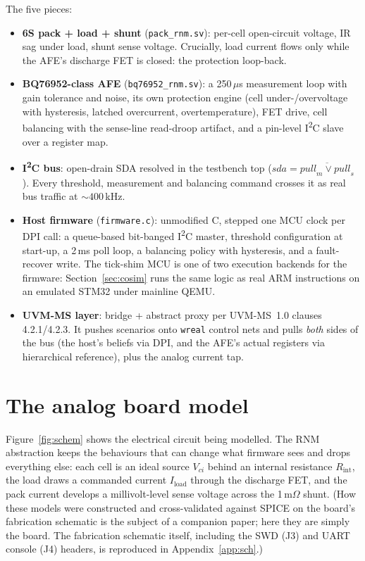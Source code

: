 \documentclass[11pt]{article}
\newcommand{\iic}{I\textsuperscript{2}C}
\begin{document}
The five pieces:

\begin{itemize}
  \item \textbf{6S pack + load + shunt} (\texttt{pack\_rnm.sv}):
    per-cell open-circuit voltage, IR sag under load, shunt sense
    voltage.  Crucially, load current flows only while the AFE's
    discharge FET is closed: the protection loop-back.
  \item \textbf{BQ76952-class AFE} (\texttt{bq76952\_rnm.sv}):
    a 250\,$\mu$s measurement loop with gain tolerance and noise, its
    own protection engine (cell under-/overvoltage with hysteresis,
    latched overcurrent, overtemperature), FET drive, cell balancing
    with the sense-line read-droop artifact, and a pin-level \iic{}
    slave over a register map.
  \item \textbf{\iic{} bus}: open-drain SDA resolved in the testbench
    top ($\mathit{sda} = \overline{\mathit{pull}_m \lor
    \mathit{pull}_s}$).  Every threshold, measurement and balancing
    command crosses it as real bus traffic at ${\sim}400$\,kHz.
  \item \textbf{Host firmware} (\texttt{firmware.c}): unmodified C,
    stepped one MCU clock per DPI call: a queue-based bit-banged
    \iic{} master, threshold configuration at start-up, a 2\,ms poll
    loop, a balancing policy with hysteresis, and a fault-recover
    write.  The tick-shim MCU is one of two execution backends for
    the firmware: Section~\ref{sec:cosim} runs the same logic as
    real ARM instructions on an emulated STM32 under mainline QEMU.
  \item \textbf{UVM-MS layer}: bridge + abstract proxy per UVM-MS~1.0
    clauses 4.2.1/4.2.3.  It pushes scenarios onto \texttt{wreal}
    control nets and pulls \emph{both} sides of the bus (the host's
    beliefs via DPI, and the AFE's actual registers via hierarchical
    reference), plus the analog current tap.
\end{itemize}

\section{The analog board model}

Figure~\ref{fig:schem} shows the electrical circuit being modelled.
The RNM abstraction keeps the behaviours that can change what firmware
sees and drops everything else: each cell is an ideal source $V_{ci}$
behind an internal resistance $R_{\mathrm{int}}$, the load draws a
commanded current $I_{\mathrm{load}}$ through the discharge FET, and
the pack current develops a millivolt-level sense voltage across the
1\,m$\Omega$ shunt.  (How these models were constructed and
cross-validated against SPICE on the board's fabrication schematic is
the subject of a companion paper; here they are simply the board.
The fabrication schematic itself, including the SWD (J3) and UART
console (J4) headers, is reproduced in Appendix~\ref{app:sch}.)
\end{document}
